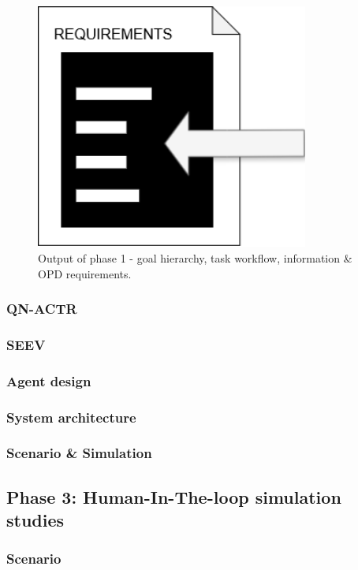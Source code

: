 \documentclass[12pt,a4paper]{article} %
\begin{document}
\begin{figure}[h!]
\begin{minipage}[b]{0.3\textwidth}
		\end{minipage}
		\begin{minipage}[b]{0.3\textwidth}
			\centering
			\includegraphics[width=0.8\textwidth]{images/requirements.png}
		\end{minipage}
		\caption{Output of phase 1 - goal hierarchy, task workflow, information \& OPD requirements.}
		\label{fig:logos}
	\end{figure}

	\subsubsection{QN-ACTR}
	\subsubsection{SEEV}
	\subsubsection{Agent design}
	\subsubsection{System architecture}
	\subsubsection{Scenario \& Simulation}
	\subsection{Phase 3: Human-In-The-loop simulation studies}
	\subsubsection{Scenario}
\end{document}
